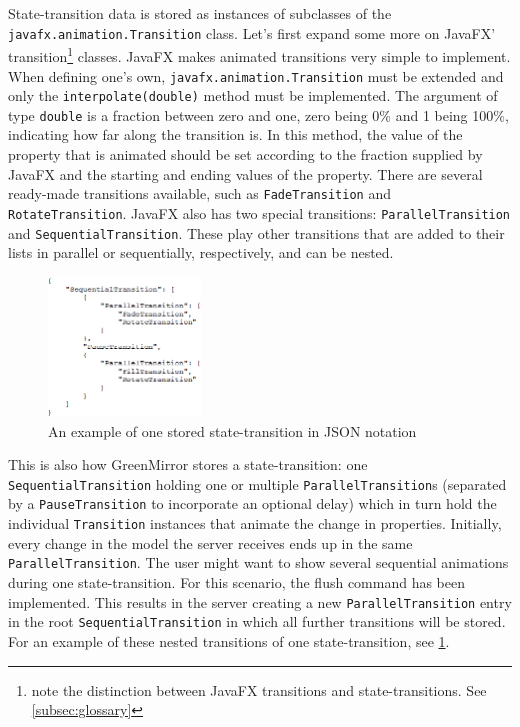 \documentclass[a4paper]{article}
\begin{document}
	State-transition data is stored as instances of subclasses of the \lstinline{javafx.animation.Transition} class. Let's first expand some more on JavaFX' transition\footnote{note the distinction between JavaFX transitions and state-transitions. See \cref{subsec:glossary}} classes. JavaFX makes animated transitions very simple to implement. When defining one's own, \lstinline{javafx.animation.Transition} must be extended and only the \lstinline{interpolate(double)} method must be implemented. The argument of type \lstinline{double} is a fraction between zero and one, zero being 0\% and 1 being 100\%, indicating how far along the transition is. In this method, the value of the property that is animated should be set according to the fraction supplied by JavaFX and the starting and ending values of the property. There are several ready-made transitions available, such as \lstinline{FadeTransition} and \lstinline{RotateTransition}. JavaFX also has two special transitions: \lstinline{ParallelTransition} and \lstinline{SequentialTransition}. These play other transitions that are added to their lists in parallel or sequentially, respectively, and can be nested.
	
	\begin{figure}\vspace{-20pt}
		\begin{center}
			\includegraphics[width=0.36\textwidth]{diagrams/transitiontree}
		\end{center}
		\vspace{-10pt}\caption{An example of one stored state-transition in JSON notation}\vspace{-12pt}
		\label{fig:transitiontree}
	\end{figure}
	This is also how GreenMirror stores a state-transition: one \lstinline{SequentialTransition} holding one or multiple \lstinline{ParallelTransition}s (separated by a \lstinline{PauseTransition} to incorporate an optional delay) which in turn hold the individual \lstinline{Transition} instances that animate the change in properties. Initially, every change in the model the server receives ends up in the same \lstinline{ParallelTransition}. The user might want to show several sequential animations during one state-transition. For this scenario, the flush command has been implemented. This results in the server creating a new \lstinline{ParallelTransition} entry in the root \lstinline{SequentialTransition} in which all further transitions will be stored. For an example of these nested transitions of one state-transition, see \cref{fig:transitiontree}.
	
\end{document}
